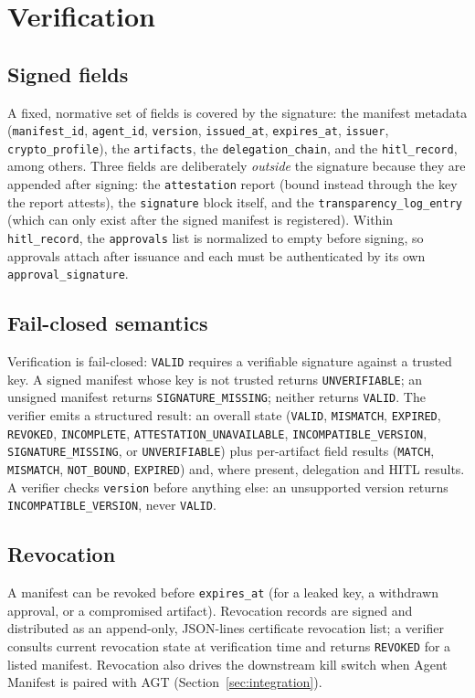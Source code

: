 \section{Verification}
\label{sec:verification}

\subsection{Signed fields}

A fixed, normative set of fields is covered by the signature: the manifest metadata
(\texttt{manifest\_id}, \texttt{agent\_id}, \texttt{version}, \texttt{issued\_at},
\texttt{expires\_at}, \texttt{issuer}, \texttt{crypto\_profile}), the
\texttt{artifacts}, the \texttt{delegation\_chain}, and the \texttt{hitl\_record},
among others. Three fields are deliberately \emph{outside} the signature because they
are appended after signing: the \texttt{attestation} report (bound instead through the
key the report attests), the \texttt{signature} block itself, and the
\texttt{transparency\_log\_entry} (which can only exist after the signed manifest is
registered). Within \texttt{hitl\_record}, the \texttt{approvals} list is normalized
to empty before signing, so approvals attach after issuance and each must be
authenticated by its own \texttt{approval\_signature}.

\subsection{Fail-closed semantics}

Verification is fail-closed: \texttt{VALID} requires a verifiable signature against a
trusted key. A signed manifest whose key is not trusted returns
\texttt{UNVERIFIABLE}; an unsigned manifest returns \texttt{SIGNATURE\_MISSING};
neither returns \texttt{VALID}. The verifier emits a structured result: an overall
state (\texttt{VALID}, \texttt{MISMATCH}, \texttt{EXPIRED}, \texttt{REVOKED},
\texttt{INCOMPLETE}, \texttt{ATTESTATION\_UNAVAILABLE}, \texttt{INCOMPATIBLE\_VERSION},
\texttt{SIGNATURE\_MISSING}, or \texttt{UNVERIFIABLE}) plus per-artifact field
results (\texttt{MATCH}, \texttt{MISMATCH}, \texttt{NOT\_BOUND}, \texttt{EXPIRED}) and,
where present, delegation and HITL results. A verifier checks \texttt{version} before
anything else: an unsupported version returns \texttt{INCOMPATIBLE\_VERSION}, never
\texttt{VALID}.

\subsection{Revocation}

A manifest can be revoked before \texttt{expires\_at} (for a leaked key, a
withdrawn approval, or a compromised artifact). Revocation records are signed and
distributed as an append-only, JSON-lines certificate revocation list; a verifier
consults current revocation state at verification time and returns \texttt{REVOKED}
for a listed manifest. Revocation also drives the downstream kill switch when Agent
Manifest is paired with AGT (Section~\ref{sec:integration}).
